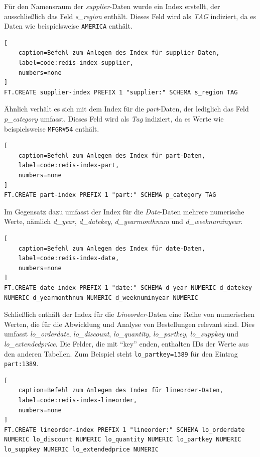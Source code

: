 Für den Namensraum der \emph{supplier}-Daten wurde ein Index erstellt, der ausschließlich das Feld \emph{s\_region} enthält. Dieses Feld wird als \emph{TAG} indiziert, da es Daten wie beispielsweise \lstinline|AMERICA| enthält.

\begin{lstlisting}[
    caption=Befehl zum Anlegen des Index für supplier-Daten,
    label=code:redis-index-supplier,
    numbers=none
]
FT.CREATE supplier-index PREFIX 1 "supplier:" SCHEMA s_region TAG
\end{lstlisting}


Ähnlich verhält es sich mit dem Index für die \emph{part}-Daten, der lediglich das Feld \emph{p\_category} umfasst. Dieses Feld wird als \emph{Tag} indiziert, da es Werte wie beispielsweise \lstinline|MFGR#54| enthält.

\begin{lstlisting}[
    caption=Befehl zum Anlegen des Index für part-Daten,
    label=code:redis-index-part,
    numbers=none
]
FT.CREATE part-index PREFIX 1 "part:" SCHEMA p_category TAG
\end{lstlisting}


Im Gegensatz dazu umfasst der Index für die \emph{Date}-Daten mehrere numerische Werte, nämlich \emph{d\_year}, \emph{d\_datekey}, \emph{d\_yearmonthnum} und \emph{d\_weeknuminyear}. 

\begin{lstlisting}[
    caption=Befehl zum Anlegen des Index für date-Daten,
    label=code:redis-index-date,
    numbers=none
]
FT.CREATE date-index PREFIX 1 "date:" SCHEMA d_year NUMERIC d_datekey NUMERIC d_yearmonthnum NUMERIC d_weeknuminyear NUMERIC
\end{lstlisting}


Schließlich enthält der Index für die \emph{Lineorder}-Daten eine Reihe von numerischen Werten, die für die Abwicklung und Analyse von Bestellungen relevant sind. Dies umfasst \emph{lo\_orderdate}, \emph{lo\_discount}, \emph{lo\_quantity}, \emph{lo\_partkey}, \emph{lo\_suppkey} und \emph{lo\_extendedprice}. Die Felder, die mit \enquote{key} enden, enthalten IDs der Werte aus den anderen Tabellen. Zum Beispiel steht \lstinline|lo_partkey=1389| für den Eintrag \lstinline|part:1389|.

\begin{lstlisting}[
    caption=Befehl zum Anlegen des Index für lineorder-Daten,
    label=code:redis-index-lineorder,
    numbers=none
]
FT.CREATE lineorder-index PREFIX 1 "lineorder:" SCHEMA lo_orderdate NUMERIC lo_discount NUMERIC lo_quantity NUMERIC lo_partkey NUMERIC lo_suppkey NUMERIC lo_extendedprice NUMERIC
\end{lstlisting}

